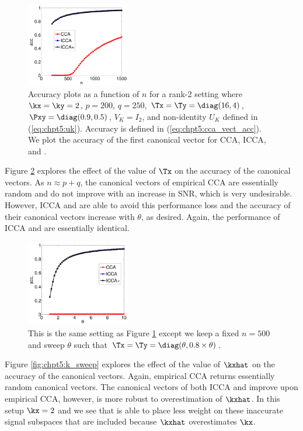 \begin{figure}
  \centering
  \includegraphics[width=0.4\textwidth]{chpt5_icca_vect/figs/asilomar_n.pdf}  
  \caption{Accuracy plots as a function of $n$ for a rank-2 setting where $\kx=\ky=2$,
      $p=200$, $q=250$, $\Tx=\Ty=\diag(16,4)$, $\Pxy=\diag(0.9,0.5)$, $V_K=I_2$, and
      non-identity $U_K$ defined in (\ref{eq:chpt5:uk}). Accuracy is defined in
      (\ref{eq:chpt5:cca_vect_acc}). We plot the accuracy of the first canonical vector
      for CCA, ICCA, and \iccaps.}
  \label{fig:chpt5:n_sweep}
\end{figure}

Figure \ref{fig:chpt5:theta_sweep} explores the effect of the value of $\Tx$ on the
accuracy of the canonical vectors. As $n\approx p+q$, the canonical vectors of empirical
CCA are essentially random and do not improve with an increase in SNR, which is very
undesirable. However, ICCA and \iccap are able to avoid this performance loss and the
accuracy of their canonical vectors increase with $\theta$, as desired. Again, the
performance of ICCA and \iccap are essentially identical. 

\begin{figure}
  \centering
  \includegraphics[width=0.4\textwidth]{chpt5_icca_vect/figs/asilomar_theta.pdf}  
  \caption{This is the same setting as Figure \ref{fig:chpt5:n_sweep} except we
    keep a fixed $n=500$ and sweep $\theta$ such that
    $\Tx=\Ty=\diag(\theta,0.8\times\theta)$. }
  \label{fig:chpt5:theta_sweep}
\end{figure}

Figure \ref{fig:chpt5:k_sweep} explores the effect of the value of $\kxhat$ on the
accuracy of the canonical vectors. Again, empirical CCA returns essentially random
canonical vectors. The canonical vectors of both ICCA and \iccap improve upon empirical
CCA, however, \iccap is more robust to overestimation of $\kxhat$. In this setup $\kx=2$
and we see that \iccap is able to place less weight on these inaccurate signal subspaces
that are included because $\kxhat$ overestimates $\kx$.

